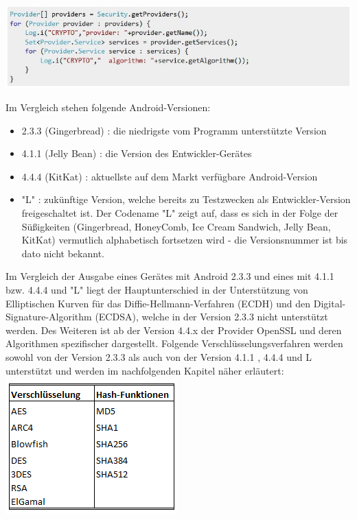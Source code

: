 \documentclass[10pt, a4paper,headsepline]{scrreprt}
\begin{document}
\begin{center}
\includegraphics[scale=0.8]{read_cryptoprovider.JPG} %
\end{center}
Im Vergleich stehen folgende Android-Versionen:
\begin{itemize}
\item 2.3.3 (Gingerbread) : die niedrigste vom Programm unterstützte Version
\item 4.1.1 (Jelly Bean) : die Version des Entwickler-Gerätes
\item 4.4.4 (KitKat) : aktuellste auf dem Markt verfügbare Android-Version
\item "L" : zukünftige Version, welche bereits zu Testzwecken als Entwickler-Version freigeschaltet ist. Der Codename "L" zeigt auf, dass es sich in der Folge der Süßigkeiten (Gingerbread, HoneyComb, Ice Cream Sandwich, Jelly Bean, KitKat) vermutlich alphabetisch fortsetzen wird - die Versionsnummer ist bis dato nicht bekannt.
\end{itemize}
Im Vergleich der Ausgabe eines Gerätes mit Android 2.3.3 und eines mit 4.1.1 bzw. 4.4.4 und "L" liegt der Hauptunterschied in der Unterstützung von Elliptischen Kurven für das Diffie-Hellmann-Verfahren (ECDH) und den Digital-Signature-Algorithm (ECDSA), welche in der Version 2.3.3 nicht unterstützt werden. Des Weiteren ist ab der Version 4.4.x der Provider OpenSSL und deren Algorithmen spezifischer dargestellt.
Folgende Verschlüsselungsverfahren werden sowohl von der Version 2.3.3 als auch von der Version 4.1.1 , 4.4.4 und L unterstützt und werden im nachfolgenden Kapitel näher erläutert: \\

\includegraphics[scale=1.0]{vorh_crypto.PNG}
\hfill
\end{document}
